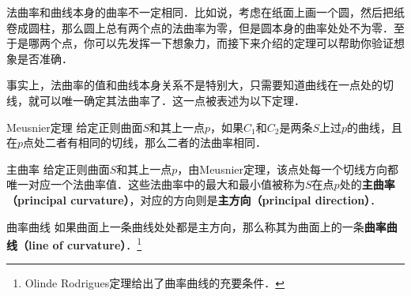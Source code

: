 法曲率和曲线本身的曲率不一定相同．比如说，考虑在纸面上画一个圆，然后把纸卷成圆柱，那么圆上总有两个点的法曲率为零，但是圆本身的曲率处处不为零．至于是哪两个点，你可以先发挥一下想象力，而接下来介绍的定理可以帮助你验证想象是否准确．

事实上，法曲率的值和曲线本身关系不是特别大，只需要知道曲线在一点处的切线，就可以唯一确定其法曲率了．这一点被表述为以下定理．

\begin{theorem}{Meusnier定理}
给定正则曲面$S$和其上一点$p$，如果$C_1$和$C_2$是两条$S$上过$p$的曲线，且在$p$点处二者有相同的切线，那么二者的法曲率相同．
\end{theorem}

\begin{definition}{主曲率}
给定正则曲面$S$和其上一点$p$，由Meusnier定理，该点处每一个切线方向都唯一对应一个法曲率值．这些法曲率中的最大和最小值被称为$S$在点$p$处的\textbf{主曲率（principal curvature）}，对应的方向则是\textbf{主方向（principal direction）}．
\end{definition}

\begin{definition}{曲率曲线}
如果曲面上一条曲线处处都是主方向，那么称其为曲面上的一条\textbf{曲率曲线（line of curvature）}．\footnote{Olinde Rodrigues定理给出了曲率曲线的充要条件．}
\end{definition}
